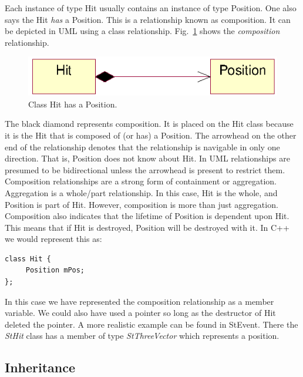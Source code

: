 \documentclass[twoside]{article}
\newcommand{\name}[1]{\textsl{#1}}%
\newcommand{\StEvent}{\textsf{StEvent}}
\begin{document}
Each instance of type Hit usually contains an instance of type
Position. One also says the Hit \emph{has} a Position. This is a
relationship known as composition. It can be depicted in UML using a
class relationship.  Fig.~\ref{fig:umlComposition} shows the
\emph{composition} relationship.
\begin{figure}[htb]
    \begin{center}
        \includegraphics{umlComposition.eps}
        \caption{Class Hit has a Position.}
        \label{fig:umlComposition}
    \end{center}
\end{figure}
The black diamond represents composition. It is placed on the Hit
class because it is the Hit that is composed of (or has) a Position.
The arrowhead on the other end of the relationship denotes that the
relationship is navigable in only one direction. That is, Position
does not know about Hit. In UML relationships are presumed to be
bidirectional unless the arrowhead is present to restrict them.
Composition relationships are a strong form of containment or
aggregation. Aggregation is a whole/part relationship. In this case,
Hit is the whole, and Position is part of Hit. However, composition is
more than just aggregation. Composition also indicates that the
lifetime of Position is dependent upon Hit. This means that if Hit is
destroyed, Position will be destroyed with it.  In C++ we would
represent this as:

{\footnotesize
\begin{verbatim}
class Hit {
     Position mPos;
};
\end{verbatim}
}%

In this case we have represented the composition relationship as a
member variable. We could also have used a pointer so long as the
destructor of Hit deleted the pointer.  A more realistic example can
be found in \StEvent. There the \name{StHit} class has a member of
type \name{StThreeVector} which represents a position.

\subsection{Inheritance}
\end{document}
